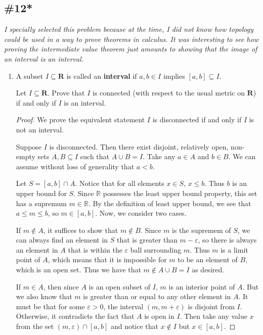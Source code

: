 \documentclass{article}
\newcommand{\R}{\mathbf{R}}
\theoremstyle{plain} %
\numberwithin{thm}{section} %
\theoremstyle{definition}
\begin{document}
        \subsection{\#12*}

        \textit{I specially selected this problem because at the time, I did not know how topology could be used in a way to prove theorems in calculus. It was interesting to see how proving the intermediate value theorem just amounts to showing that the image of an interval is an interval.}

        \begin{enumerate}[label=(\alph*)]
            \item A subset $I\subseteq \R$ is called an \textbf{interval} if $a,b\in I$ implies $[a,b]\subseteq I$.
    
            Let $I\subseteq \R$. Prove that $I$ is connected (with respect to the usual metric on $\R$) if and only if $I$ is an interval.
            
            \begin{proof}
                We prove the equivalent statement \(I\) is disconnected if and only if \(I\) is not an interval.
    
                Suppose \(I\) is disconnected. Then there exist disjoint, relatively open, non-empty sets \(A,B \subseteq I\) such that \(A \cup B = I\). Take any \(a \in A\) and \(b \in B\). We can assume without loss of generality that \(a<b\).
    
                Let \(S = [a,b]\cap A\). Notice that for all elements \(x \in S\), \(x \leq b\). Thus \(b\) is an upper bound for \(S\). Since \(\mathbb{R}\) possesses the least upper bound property, this set has a supremum \(m \in \mathbb{R}\). By the definition of least upper bound, we see that \(a \leq m \leq b\), so \(m \in [a,b]\). Now, we consider two cases.
    
                If \(m \notin A\), it suffices to show that \(m \notin B\). Since \(m\) is the supremem of \(S\), we can always find an element in \(S\) that is greater than \(m - \varepsilon\), so there is always an element in \(A\) that is within the \(\varepsilon\) ball surrounding \(m\). Thus \(m\) is a limit point of \(A\), which means that it is impossible for \(m\) to be an element of \(B\), which is an open set. Thus we have that \(m \notin A \cup B = I\) as desired.
    
                If \(m \in A\), then since \(A\) is an open subset of \(I\), \(m\) is an interior point of \(A\). But we also know that \(m\) is greater than or equal to any other element in \(A\). It must be that for some \(\varepsilon > 0\), the interval \((m, m + \varepsilon)\) is disjoint from \(I\). Otherwise, it contradicts the fact that \(A\) is open in \(I\). Then take any value \(x\) from the set \((m,\varepsilon) \cap [a, b]\) and notice that \(x \notin I\) but \(x \in [a,b]\).
    

\end{proof}
\end{enumerate}
\end{document}
